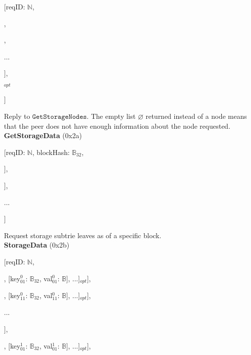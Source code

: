 \documentclass{amsart}
\begin{document}
[reqID: $\mathbb{N}$,

\quad [

\qquad [node$^0_0$: $\mathbb{B}$, node$^0_1$: $\mathbb{B}$, ...],

,

\qquad ...

\quad ],

$_{opt}$

]
\medskip

Reply to $\texttt{GetStorageNodes}$.
The empty list $\varnothing$ returned instead of a node means that the peer does not have enough information about the node requested.\\

\textbf{GetStorageData} (0x2a)

[reqID: $\mathbb{N}$, blockHash: $\mathbb{B}_{32}$,

\quad [addressHash$^0$: $\mathbb{B}_{32}$, [prefix$^0_0$: $\mathbb{Y}$, prefix$^0_1$: $\mathbb{Y}$, ...]],

\quad [addressHash$^1$: $\mathbb{B}_{32}$, [prefix$^1_0$: $\mathbb{Y}$, prefix$^1_1$: $\mathbb{Y}$, ...]],

\quad ...

]
\medskip

Request storage subtrie leaves as of a specific block.\\

\textbf{StorageData} (0x2b)

[reqID: $\mathbb{N}$,

\quad [

\qquad [

\quad \qquad [status$^0_0$: $\mathbb{N}$, [[key$^0_{00}$: $\mathbb{B}_{32}$, val$^0_{00}$: $\mathbb{B}$], [key$^0_{01}$: $\mathbb{B}_{32}$, val$^0_{01}$: $\mathbb{B}$], ...]$_{opt}$],

\quad \qquad [status$^0_1$: $\mathbb{N}$, [[key$^0_{10}$: $\mathbb{B}_{32}$, val$^0_{10}$: $\mathbb{B}$], [key$^0_{11}$: $\mathbb{B}_{32}$, val$^0_{11}$: $\mathbb{B}$], ...]$_{opt}$],

\quad \qquad ...

\qquad ],

\qquad [

\quad \qquad [status$^1_0$: $\mathbb{N}$, [[key$^1_{00}$: $\mathbb{B}_{32}$, val$^1_{00}$: $\mathbb{B}$], [key$^1_{01}$: $\mathbb{B}_{32}$, val$^1_{01}$: $\mathbb{B}$], ...]$_{opt}$],
\end{document}
